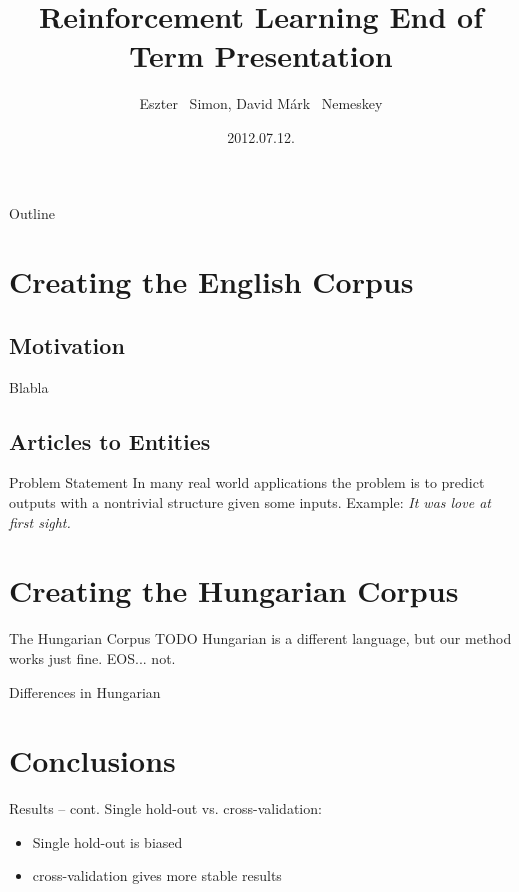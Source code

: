 \documentclass[utf8x]{beamer}
\title %
{Reinforcement Learning End of Term Presentation}
\author %
{Eszter ~Simon, David Márk ~Nemeskey}
\institute[Computer and Automation Research Institue of the Hungarian Academy of Sciences] %
{
  Data Mining and Search Research Group\\
  MTA SZTAKI
}
\date %
{2012.07.12.}
\newcommand{\vitem}{\vfill \item}
\begin{document}
\begin{frame}{Outline}
  \titlepage
\end{frame}

\section{Creating the English Corpus}
\subsection*{Motivation}
\begin{frame}{Blabla}
\end{frame}
\subsection{Articles to Entities}
\begin{frame}{Problem Statement}
  In many real world applications the problem is to predict outputs with a nontrivial structure given some inputs.
  \vfill
  Example: \textit{\small It was love at first sight.}
  \vfill
\end{frame}

\section{Creating the Hungarian Corpus}
\begin{frame}{The Hungarian Corpus}
 TODO  Hungarian is a different language, but our method works just fine. EOS... not.
\end{frame}
\begin{frame}{Differences in Hungarian}

\end{frame}

\section{Conclusions}
\begin{frame}{Results -- cont.}
  Single hold-out vs. cross-validation:
  \begin{itemize}
  \vitem Single hold-out is biased
  \vitem cross-validation gives more stable results
  \end{itemize}
  \vfill
\end{frame}
\end{document}
